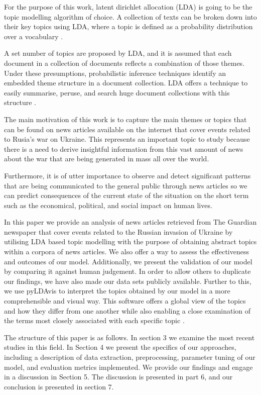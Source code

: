 \documentclass[twoside,11pt,a4paper]{article}
\begin{document}
For the purpose of this work, latent dirichlet allocation (LDA) is going to be the topic modelling algorithm of choice. A collection of texts can be broken down into their key topics using LDA, where a topic is defined as a probability distribution over a vocabulary \citep{blei_latent_nodate}.

A set number of topics are proposed by LDA, and it is assumed that each document in a collection of documents reflects a combination of those themes. Under these presumptions, probabilistic inference techniques identify an embedded theme structure in a document collection. LDA offers a technique to easily summarise, peruse, and search huge document collections with this structure \citep{blei_probabilistic_2010}.

The main motivation of this work is to capture the main themes or topics that can be found on news articles available on the internet that cover events related to Rusia’s war on Ukraine. This represents an important topic to study because there is a need to derive insightful information from this vast amount of news about the war that are being generated in mass all over the world.

Furthermore, it is of utter importance to observe and detect significant patterns that are being communicated to the general public through news articles so we can predict consequences of the current state of the situation on the short term such as the economical, political, and social impact on human lives.

In this paper we provide an analysis of news articles retrieved from The Guardian newspaper that cover events related to the Russian invasion of Ukraine by utilising LDA based topic modelling with the purpose of obtaining abstract topics within a corpora of news articles. We also offer a way to assess the effectiveness and outcomes of our model. Additionally, we present the validation of our model by comparing it against human judgement. In order to allow others to duplicate our findings, we have also made our data sets publicly available. Further to this, we use pyLDAvis to interpret the topics obtained by our model in a more comprehensible and visual way. This software offers a global view of the topics and how they differ from one another while also enabling a close examination of the terms most closely associated with each specific topic \citep{sievert_ldavis_2014}.

The structure of this paper is as follows. In section 3 we examine the most recent studies in this field. In Section 4 we present the specifics of our approaches, including a description of data extraction, preprocessing, parameter tuning of our model, and evaluation metrics implemented. We provide our findings and engage in a discussion in Section 5. The discussion is presented in part 6, and our conclusion is presented in section 7.
\end{document}
